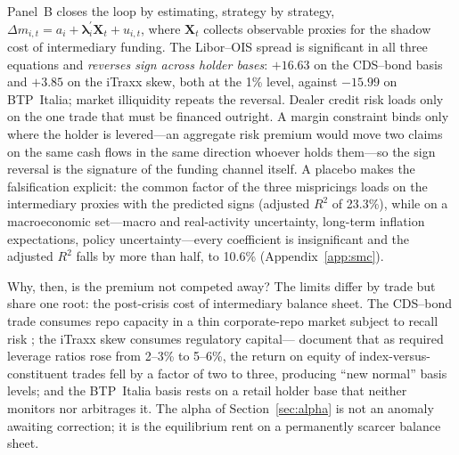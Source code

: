 Panel~B closes the loop by estimating, strategy by strategy,
$\Delta m_{i,t} = a_i + \boldsymbol{\lambda}_i^{\prime}\mathbf{X}_t +
u_{i,t}$, where $\mathbf{X}_t$ collects observable proxies for the shadow
cost of intermediary funding. The Libor--OIS spread is
significant in all three equations and \emph{reverses sign across holder
bases}: $+16.63$ on the CDS--bond basis and $+3.85$ on the iTraxx skew, both
at the 1\% level, against $-15.99$ on BTP~Italia; market illiquidity repeats
the reversal. Dealer credit risk loads only on the one trade that must be
financed outright. A margin constraint binds only where the holder is
levered---an aggregate risk premium would move two claims on the same cash
flows in the same direction whoever holds them---so the sign reversal is the
signature of the funding channel itself. A placebo makes the falsification
explicit: the common factor of the three mispricings loads on the intermediary
proxies with the predicted signs (adjusted $R^2$ of 23.3\%), while on a
macroeconomic set---macro and real-activity uncertainty, long-term inflation
expectations, policy uncertainty---every coefficient is insignificant and the
adjusted $R^2$ falls by more than half, to 10.6\% (Appendix~\ref{app:smc}).

Why, then, is the premium not competed away? The limits differ by trade but
share one root: the post-crisis cost of intermediary balance sheet. The
CDS--bond trade consumes repo capacity in a thin corporate-repo market subject
to recall risk \citep{bai2019cds, mitchell2012arbitrage}; the iTraxx skew
consumes regulatory capital---\citet{boyarchenko2016trends} document that as
required leverage ratios rose from 2--3\% to 5--6\%, the return on equity of
index-versus-constituent trades fell by a factor of two to three, producing
``new normal'' basis levels; and the BTP~Italia basis rests on a
retail holder base that neither monitors nor arbitrages it. The alpha of
Section~\ref{sec:alpha} is not an anomaly awaiting correction; it is the
equilibrium rent on a permanently scarcer balance sheet.


